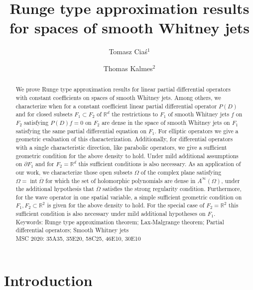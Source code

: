 \documentclass[10pt,leqno]{amsart}
\title[Runge approximation results for spaces of smooth Whitney jets]{Runge type approximation results for spaces of smooth Whitney jets}
\author[T.~Cia\'s]{Tomasz Cia\'s$^1$\orcidlink{0000-0001-7119-7814}}
\author[T.~Kalmes]{Thomas Kalmes$^2$\orcidlink{0000-0001-7542-1334}}
\date{}
\theoremstyle{definition}
\newcommand{\R}{\mathbb R}
\begin{document}
	
\begin{abstract}
	We prove Runge type approximation results for linear partial differential operators with constant coefficients on spaces of smooth Whitney jets. Among others, we characterize when for a constant coefficient linear partial differential operator $P(D)$ and for closed subsets $F_1\subset F_2$ of $\R^d$ the restrictions to $F_1$ of smooth Whitney jets $f$ on $F_2$ satisfying $P(D)f=0$ on $F_2$ are dense in the space of smooth Whitney jets on $F_1$ satisfying the same partial differential equation on $F_1$. For elliptic operators we give a geometric evaluation of this characterization. Additionally, for differential operators with a single characteristic direction, like parabolic operators, we give a sufficient geometric condition for the above density to hold. Under mild additional assumptions on $\partial F_1$ and for $F_2=\R^d$ this sufficient conditions is also necessary. As an application of our work, we characterize those open subsets $\Omega$ of the complex plane satisfying $\Omega=\operatorname{int}\overline{\Omega}$ for which the set of holomorphic polynomials are dense in $A^\infty(\Omega)$, under the additional hypothesis that $\overline{\Omega}$ satisfies the strong regularity condition. Furthermore, for the wave operator in one spatial variable, a simple sufficient geometric condition on $F_1, F_2\subset\R^2$ is given for the above density to hold. For the special case of $F_2=\R^2$ this sufficient condition is also necessary under mild additional hypotheses on $F_1$.\\
	
	\noindent Keywords: Runge type approximation theorem; Lax-Malgrange theorem; Partial differential operators; Smooth Whitney jets\\
	
	\noindent MSC 2020: 35A35, 35E20, 58C25, 46E10, 30E10
\end{abstract}

\maketitle

\section{Introduction}\label{section:introduction}
\end{document}
